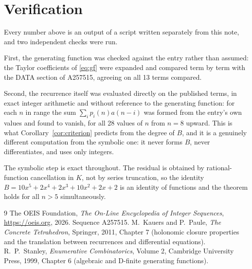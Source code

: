 \documentclass[11pt,a4paper]{article}
\theoremstyle{plain}
\theoremstyle{definition}
\begin{document}
\section{Verification}

Every number above is an output of a script written separately from this note, and two
independent checks were run.

First, the generating function was checked against the entry rather than assumed: the
Taylor coefficients of \eqref{eq:gf} were expanded and compared term by term with the DATA
section of A257515, agreeing on all 13 terms compared.

Second, the recurrence itself was evaluated directly on the published terms, in exact
integer arithmetic and without reference to the generating function: for each $n$ in range
the sum $\sum_{i}p_{i}(n)a(n-i)$ was formed from the entry's own values and found to
vanish, for all 28 values of $n$ from $n=8$ upward. This is what
Corollary~\ref{cor:criterion} predicts from the degree of $B$, and it is a genuinely
different computation from the symbolic one: it never forms $B$, never differentiates, and
uses only integers.

The symbolic step is exact throughout. The residual is obtained by rational-function
cancellation in $K$, not by series truncation, so the identity $B=10 x^{5} + 2 x^{4} + 2 x^{3} + 10 x^{2} + 2 x + 2$ is an
identity of functions and the theorem holds for all $n>5$ simultaneously.

\begin{thebibliography}{9}
 The OEIS Foundation, \emph{The On-Line Encyclopedia of Integer Sequences},
\url{https://oeis.org}, 2026. Sequence A257515.
 M.~Kauers and P.~Paule, \emph{The Concrete Tetrahedron}, Springer, 2011,
Chapter 7 (holonomic closure properties and the translation between recurrences and
differential equations).
 R.~P.~Stanley, \emph{Enumerative Combinatorics}, Volume 2, Cambridge
University Press, 1999, Chapter 6 (algebraic and D-finite generating functions).
\end{thebibliography}
\end{document}

